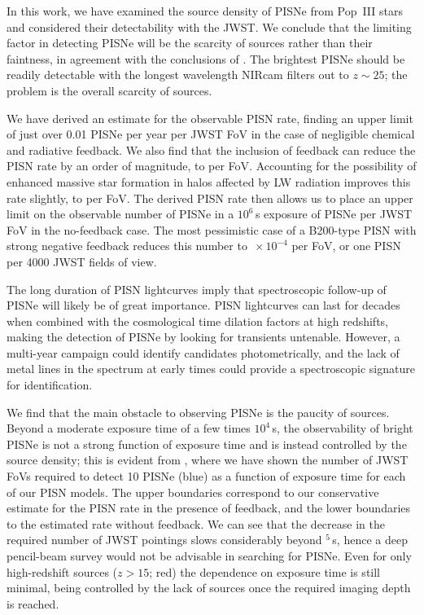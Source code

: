 \documentclass[../thesis.tex]{subfiles}
\begin{document}
In this work, we have examined the source density of PISNe from
Pop~III stars and considered their detectability with the JWST. We
conclude that the limiting factor in detecting PISNe will be the
scarcity of sources rather than their faintness, in agreement with the
conclusions of \citet{WeinmannLilly2005}. The brightest PISNe should
be readily detectable with the longest wavelength NIRcam filters out
to $z\sim25$; the problem is the overall scarcity of sources.

 We have derived an estimate for the observable PISN rate, finding an
 upper limit of just over 0.01 PISNe per year per JWST FoV in the case
 of negligible chemical and radiative feedback. We also find that the
 inclusion of feedback can reduce the PISN rate by an order of
 magnitude, to  per FoV. Accounting for the possibility of
 enhanced massive star formation in halos affected by LW radiation improves
 this rate slightly, to  per FoV.  The derived PISN rate
 then allows us to place an upper limit on the observable number of
 PISNe in a $10^6\,$s exposure of  PISNe per JWST FoV in the
 no-feedback case. The most pessimistic case of a B200-type PISN with
 strong negative feedback reduces this number to
 $\,\times10^{-4}$ per FoV, or one PISN per 4000 JWST fields
 of view.

 The long duration of PISN lightcurves imply that spectroscopic
 follow-up of PISNe will likely be of great importance. PISN
 lightcurves can last for decades when combined with the cosmological
 time dilation factors at high redshifts, making the detection of
 PISNe by looking for transients untenable.  However, a multi-year
 campaign could identify candidates photometrically, and the lack of
 metal lines in the spectrum at early times could provide a
 spectroscopic signature for identification.

We find that the main obstacle to observing PISNe is the paucity of
sources.  Beyond a moderate exposure time of a few times $10^4\,$s,
the observability of bright PISNe is not a strong function of exposure
time and is instead controlled by the source density; this is evident
from , where we have shown the number of JWST
FoVs required to detect 10 PISNe (blue) as a function of exposure time
for each of our PISN models.  The upper boundaries correspond to our
conservative estimate for the PISN rate in the presence of feedback,
and the lower boundaries to the estimated rate without feedback. We can
see that the decrease in the required number of JWST pointings slows
considerably beyond $^5\,$s, hence a deep pencil-beam survey
would not be advisable in searching for PISNe. Even for only
high-redshift sources ($z>15$; red) the dependence on exposure time is
still minimal, being controlled by the lack of sources once the
required imaging depth is reached.
\end{document}
